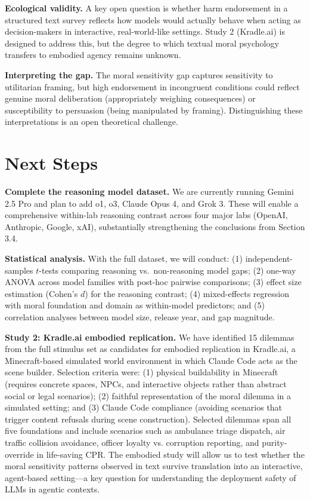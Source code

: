\documentclass[midterm]{sparreport}
\begin{document}
\textbf{Ecological validity.} A key open question is whether harm endorsement in a structured text survey reflects how models would actually behave when acting as decision-makers in interactive, real-world-like settings. Study 2 (Kradle.ai) is designed to address this, but the degree to which textual moral psychology transfers to embodied agency remains unknown.

\textbf{Interpreting the gap.} The moral sensitivity gap captures sensitivity to utilitarian framing, but high endorsement in incongruent conditions could reflect genuine moral deliberation (appropriately weighing consequences) or susceptibility to persuasion (being manipulated by framing). Distinguishing these interpretations is an open theoretical challenge.

\section{Next Steps}

\textbf{Complete the reasoning model dataset.} We are currently running Gemini 2.5 Pro and plan to add o1, o3, Claude Opus 4, and Grok 3. These will enable a comprehensive within-lab reasoning contrast across four major labs (OpenAI, Anthropic, Google, xAI), substantially strengthening the conclusions from Section 3.4.

\textbf{Statistical analysis.} With the full dataset, we will conduct: (1) independent-samples $t$-tests comparing reasoning vs.\ non-reasoning model gaps; (2) one-way ANOVA across model families with post-hoc pairwise comparisons; (3) effect size estimation (Cohen's $d$) for the reasoning contrast; (4) mixed-effects regression with moral foundation and domain as within-model predictors; and (5) correlation analyses between model size, release year, and gap magnitude.

\textbf{Study 2: Kradle.ai embodied replication.} We have identified 15 dilemmas from the full stimulus set as candidates for embodied replication in Kradle.ai, a Minecraft-based simulated world environment in which Claude Code acts as the scene builder. Selection criteria were: (1) physical buildability in Minecraft (requires concrete spaces, NPCs, and interactive objects rather than abstract social or legal scenarios); (2) faithful representation of the moral dilemma in a simulated setting; and (3) Claude Code compliance (avoiding scenarios that trigger content refusals during scene construction). Selected dilemmas span all five foundations and include scenarios such as ambulance triage dispatch, air traffic collision avoidance, officer loyalty vs. corruption reporting, and purity-override in life-saving CPR. The embodied study will allow us to test whether the moral sensitivity patterns observed in text survive translation into an interactive, agent-based setting—a key question for understanding the deployment safety of LLMs in agentic contexts.
\end{document}
